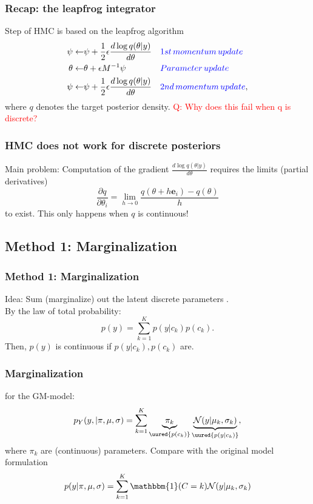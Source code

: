 \documentclass[10pt]{beamer}
\begin{document}
\begin{frame}
	\frametitle{Recap: the leapfrog integrator}
Step  of HMC is based on the leapfrog algorithm
	\begin{align*}
		\psi \leftarrow &\psi + \frac{1}{2}\epsilon \frac{d\log q(\theta|y)}{d\theta} && \textcolor{blue}{1st\,momentum\, update}\\
		\theta \leftarrow& \theta + \epsilon M^{-1}\psi  && \textcolor{blue}{Parameter\,update}\\
		\psi \leftarrow &\psi  + \frac{1}{2}\epsilon \frac{d\log q(\theta|y)}{d\theta} && \textcolor{blue}{2nd \,momentum\, update},
	\end{align*}
	where $q$ denotes the target posterior density.\pause 
	\centering
	\textcolor{red}{Q: Why does this fail when q is discrete?}
\end{frame}

\begin{frame}
	\frametitle{HMC does not work for discrete posteriors}
	Main problem:
	Computation of the gradient  $\frac{d\log q(\theta|y)}{d\theta}$ requires the limits (partial derivatives)
	\begin{equation*}
		\frac{\partial q}{\partial \theta_i} = \lim_{h\to 0} \frac{q(\theta+h\boldsymbol{e}_i) - q(\theta)}{h}
	\end{equation*}
	to exist. This only happens when $q$ is continuous!
	\end{frame}
	
\subsection{Method  1: Marginalization}

\begin{frame}
	\frametitle{Method  1: Marginalization}
	Idea: Sum (marginalize) out the latent discrete parameters \cite{stan}. \\
	By the law of total probability:
	\begin{equation*}
		p(y) = \sum_{k= 1}^K p(y|c_k)p(c_k).
	\end{equation*}
	Then, $p(y)$ is continuous if $p(y|c_k), p(c_k)$ are. 
 \end{frame}
 
\begin{frame}
	 \frametitle{Marginalization}
 	 for the GM-model:
	\begin{equation*}
		p_Y(y, |\pi, \mu, \sigma) = \sum_{k=1}^K\underbrace{\pi_k}_{\uured{p(c_k)}}\underbrace{\mathcal{N}(y | \mu_k, \sigma_k)}_{\uured{p(y|c_k)}},
	\end{equation*}
	where $\pi_k$ are (continuous) parameters.\pause
	 Compare with the original model formulation
	\begin{equation*}
		p(y|\pi, \mu, \sigma) = \sum_{k = 1}^K \mathbbm{1}(C = k)\mathcal{N}(y | \mu_k, \sigma_k)
	\end{equation*}
\end{frame}
\end{document}
